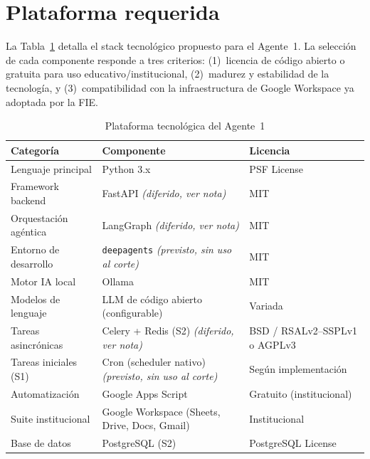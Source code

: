 \documentclass[a4paper, 12pt]{article}
\begin{document}
\section{Plataforma requerida}
\label{sec:plataforma}

La Tabla~\ref{tab:plataforma} detalla el stack tecnol\'ogico propuesto para el Agente~1. La selecci\'on de cada componente responde a tres criterios: (1)~licencia de c\'odigo abierto o gratuita para uso educativo/institucional, (2)~madurez y estabilidad de la tecnolog\'ia, y (3)~compatibilidad con la infraestructura de Google Workspace ya adoptada por la \ac{FIE}.

\begin{table}[H]
  \centering
  \caption{Plataforma tecnol\'ogica del Agente~1}
  \label{tab:plataforma}
  \begin{tabularx}{\textwidth}{l>{\raggedright\arraybackslash}Xl}
    \toprule
    \textbf{Categor\'ia} & \textbf{Componente} & \textbf{Licencia} \\
    \midrule
    Lenguaje principal      & Python 3.x                                & PSF License \\
    Framework backend       & FastAPI \emph{(diferido, ver nota)}       & MIT \\
    Orquestaci\'on ag\'entica & LangGraph \emph{(diferido, ver nota)}    & MIT \\
    Entorno de desarrollo   & \texttt{deepagents} \emph{(previsto, sin uso al corte)} & MIT \\
    Motor IA local          & Ollama                                    & MIT \\
    Modelos de lenguaje     & LLM de c\'odigo abierto (configurable)     & Variada \\
    Tareas asincr\'onicas   & Celery + Redis (S2) \emph{(diferido, ver nota)} & BSD / RSALv2--SSPLv1 o AGPLv3 \\
    Tareas iniciales (S1)   & Cron (scheduler nativo) \emph{(previsto, sin uso al corte)} & Seg\'un implementaci\'on \\
    Automatizaci\'on        & Google Apps Script                        & Gratuito (institucional) \\
    Suite institucional     & Google Workspace (Sheets, Drive, Docs, Gmail) & Institucional \\
    Base de datos           & PostgreSQL (S2)                           & PostgreSQL License \\

\end{tabularx}
\end{table}
\end{document}
